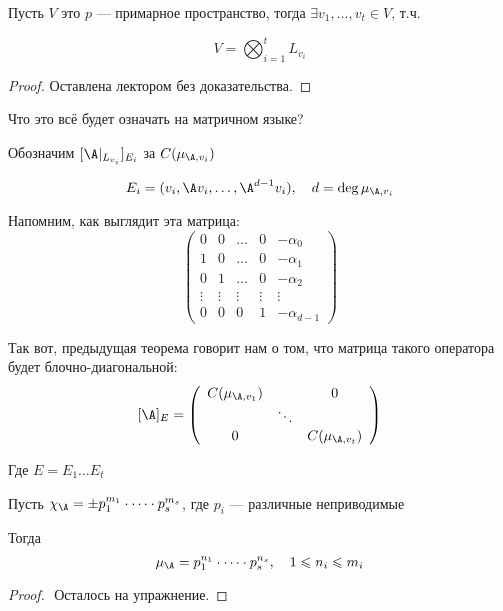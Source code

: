 \begin{theorem}
    Пусть $V$ это $p$ --- примарное пространство, тогда $\exists v_1, \dots, v_t \in V$, т.ч.

    \[ V = \bigotimes_{i = 1}^{t} L_{v_i} \]

    \begin{proof}
        Оставлена лектором без доказательства.
    \end{proof}
\end{theorem}

Что это всё будет означать на матричном языке?

\vspace*{3mm}

Обозначим $[\A |_{L_{v_i}}]_{E_i}$ за $C(\mu_{\A, v_i})$

\[ E_i = (v_i, \A v_i, \dots, \A^{d - 1} v_i), \quad d = \deg \mu_{\A, v_i} \]

Напомним, как выглядит эта матрица:
\[
    \left(\begin{array}{ccccc}
        0 & 0 & \dots & 0 & -\alpha_0 \\ 
        1 & 0 & \dots & 0 & -\alpha_1 \\ 
        0 & 1 & \dots & 0 & -\alpha_2 \\ 
        \vdots & \vdots & \vdots & \vdots & \vdots \\ 
        0 & 0 & 0 & 1 & -\alpha_{d - 1}
    \end{array}\right)    
\]

Так вот, предыдущая теорема говорит нам о том, что матрица такого оператора будет блочно-диагональной:
\[
  [ \A ]_{E} = \left(\begin{array}{ccc}
  C(\mu_{\A, v_1}) &  & 0 \\ 
   & \ddots &  \\ 
  0 &  & C(\mu_{\A, v_t})
  \end{array}\right)  
\]

Где $E = E_1\dots E_t$

\begin{follow}
    Пусть $\chi_{\A} = \pm p^{m_1}_1 \cdot \dots \cdot p^{m_s}_s$, где $p_i$ --- различные неприводимые

    Тогда 
        \[ \mu_{\A} = p^{n_1}_1 \cdot \dots \cdot p^{n_s}_s, \quad 1 \leqslant n_i \leqslant m_i \]
    
    \begin{proof}
    $ $ \newline
        Осталось на упражнение.
    \end{proof}
\end{follow}

